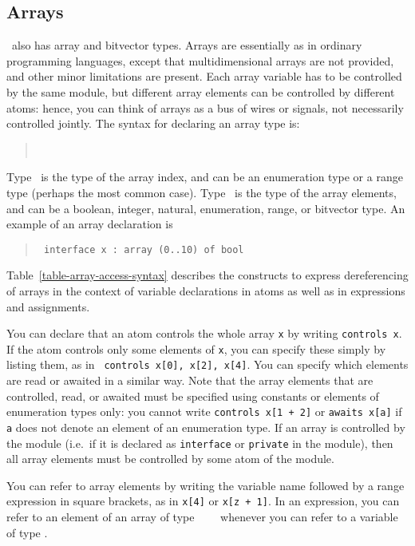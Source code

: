 
\subsection{Arrays}
\label{sec-arrays}

\mocha\ also has array and
bitvector types.  Arrays are
essentially as in ordinary programming languages, except that
multidimensional arrays are not provided, and other minor limitations
are present.  Each array variable has to be controlled by the same
module, but different array elements can be controlled by different
atoms: hence, you can think of arrays as a bus of wires or signals,
not necessarily controlled jointly. 
The syntax for declaring an array type is: 

\begin{quote} 
  \ARRAY\ \indextype\ \OF\ \elementtype
\end{quote}

Type \indextype\ is the type of the array index, and can be
an enumeration type or a range type (perhaps the most common case).
Type \elementtype\ is the type of the array elements, and can be a
boolean, integer, natural, enumeration, range, or bitvector type.
An example of an array declaration is 

\begin{quote} \tt
  interface x : array (0..10) of bool
\end{quote}

Table~\ref{table-array-access-syntax} describes the constructs
to express dereferencing of arrays in the context of variable declarations in atoms
as well as in expressions and assignments.

You can declare that an atom controls the whole array {\tt x} by
writing {\tt controls x}.  If the atom controls only some elements of
{\tt x}, you can specify these simply by listing them, as in {\tt
controls x[0], x[2], x[4]}.  You can specify which elements are read
or awaited in a similar way. 
Note that the array elements that are controlled, read, or awaited
must be specified using constants or elements of enumeration types only: you cannot write {\tt controls
x[1 + 2]} or {\tt awaits x[a]} if {\tt a} does not denote an element of an enumeration type.
If an array is controlled by the module (i.e.\ if it is declared as
{\tt interface} or {\tt private} in the module), then all array
elements must be controlled by some atom of the module.

You can refer to array elements by writing the variable name followed
by a range expression in square brackets, as in {\tt x[4]} or {\tt x[z
+ 1]}.  In an expression, you can refer to an element of an array of
type \ARRAY\ \indextype\ \OF\ \elementtype\ whenever you can refer to
a variable of type \elementtype.

